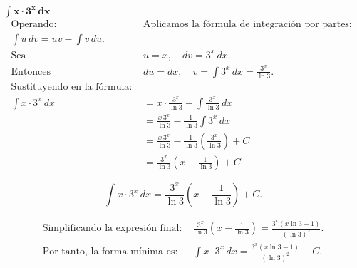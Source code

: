 $\displaystyle \mathbf{\int x \cdot 3^{x}\,dx}$
\nopagebreak
\begin{align*}
    \text{Operando: } 
    &\text{Aplicamos la fórmula de integración por partes: } 
    \\
    \int u\,dv = uv - \int v\,du. \\[6pt]
    \text{Sea } 
    &u = x, \quad dv = 3^{x}\,dx. \\[6pt]
    \text{Entonces } 
    &du = dx, \quad v = \int 3^{x}\,dx = \frac{3^{x}}{\ln 3}. \\[6pt]
    \text{Sustituyendo en la fórmula: } \\[6pt]
    \int x\cdot 3^{x}\,dx 
    &= x\cdot \frac{3^{x}}{\ln 3} - \int \frac{3^{x}}{\ln 3}\,dx \\[6pt]
    &= \frac{x\,3^{x}}{\ln 3} - \frac{1}{\ln 3}\int 3^{x}\,dx \\[6pt]
    &= \frac{x\,3^{x}}{\ln 3} - \frac{1}{\ln 3}\left(\frac{3^{x}}{\ln 3}\right) + C \\[6pt]
    &= \frac{3^{x}}{\ln 3}\left(x - \frac{1}{\ln 3}\right) + C
\end{align*}

\[
\boxed{\displaystyle 
\int x\cdot 3^{x}\,dx 
= \frac{3^{x}}{\ln 3}\left(x - \frac{1}{\ln 3}\right) + C.}
\]

\nopagebreak
\begin{align*}
    \text{Simplificando la expresión final: } 
    &\frac{3^{x}}{\ln 3}\left(x - \frac{1}{\ln 3}\right)
    = \frac{3^{x}(x\ln 3 - 1)}{(\ln 3)^{2}}. \\[6pt]
    \text{Por tanto, la forma mínima es: } 
    &\boxed{\displaystyle 
    \int x\cdot 3^{x}\,dx 
    = \frac{3^{x}(x\ln 3 - 1)}{(\ln 3)^{2}} + C.}
\end{align*}
